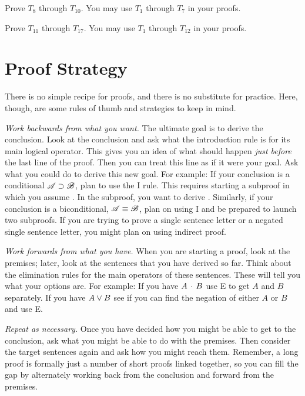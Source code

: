 {\practiceproblems
\noindent\problempart
Prove $T_{8}$ through $T_{10}$. You may use $T_{1}$ through $T_7$ in your proofs.

\noindent\problempart
Prove $T_{11}$ through $T_{17}$. You may use $T_{1}$ through $T_{12}$ in your proofs.






\section{Proof Strategy}
\setlength{\parindent}{1em}
There is no simple recipe for proofs, and there is no substitute for practice. Here, though, are some rules of thumb and strategies to keep in mind.

\emph{Work backwards from what you want.}
The ultimate goal is to derive the conclusion. Look at the conclusion and ask what the introduction rule is for its main logical operator. This gives you an idea of what should happen \emph{just before} the last line of the proof. Then you can treat this line as if it were your goal. Ask what you could do to derive this new goal. For example: If your conclusion is a conditional $\mathscr{A}\supset\mathscr{B}$, plan to use the {\eif}I rule. This requires starting a subproof in which you assume . In the subproof, you want to derive . Similarly, if your conclusion is a biconditional, $\mathscr{A} \equiv \mathscr{B}$, plan on using {\eiff}I and be prepared to launch two subproofs. If you are trying to prove a single sentence letter or a negated single sentence letter, you might plan on using indirect proof. 


\emph{Work forwards from what you have.}
When you are starting a proof, look at the premises; later, look at the sentences that you have derived so far. Think about the elimination rules for the main operators of these sentences. These will tell you what your options are. For example: If you have $A \,\cdot\, B$ use \eand E to get $A$ and $B$ separately. If you have $A \vee B$ see if you can find the negation of either $A$ or $B$ and use \eor E.

\emph{Repeat as necessary.} Once you have decided how you might be able to get to the conclusion, ask what you might be able to do with the premises. Then consider the target sentences again and ask how you might reach them.  Remember, a long proof is formally just a number of short proofs linked together, so you can fill the gap by alternately working back from the conclusion and forward from the premises.

}
